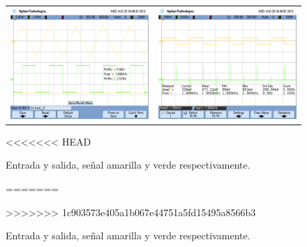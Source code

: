 \begin{figure}[H]
\begin{tabular}{c c}
		\includegraphics[scale=0.2]{Derivador/Mediciones/Osciloscopio/PCB_Sin_Compensar/scope_5.png} &
		\includegraphics[scale=0.2]{Derivador/Mediciones/Osciloscopio/PCB_Sin_Compensar/scope_7.png}
	\end{tabular}
<<<<<<< HEAD
	\caption{Entrada y salida, se\~nal amarilla y verde respectivamente.}
=======
	\caption{Entrada y salida, señal amarilla y verde respectivamente.}
>>>>>>> 1c903573e405a1b067e44751a5fd15495a8566b3
	\label{fig:derivador_respuestas}
\end{figure}

